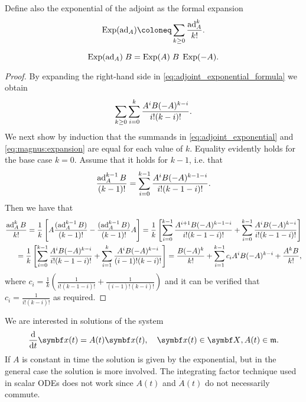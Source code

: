 Define also the exponential of the adjoint as the formal expansion
\begin{equation}
  \label{eq:adjoint_exponential}
  \Exp(\ad_\lx) \coloneq \sum_{k \geq 0} \frac{\ad_\lx^k}{k!}.
\end{equation}

\begin{lemma}
  \label{lemma:expadj}
  \begin{equation}
    \label{eq:adjoint_exponential_formula}
    \operatorname{Exp}(\operatorname{ad}_A) \; B = \operatorname{Exp}(A) \; B \; \operatorname{Exp}(-A).
  \end{equation}
\end{lemma}
\begin{proof}
  By expanding the right-hand side in \eqref{eq:adjoint_exponential_formula} we obtain
  \begin{equation}
    \label{eq:magnus:expansion}
    \sum_{k \geq 0} \sum_{i = 0}^{k} \frac{A^i B (-A)^{k-i}}{i! (k - i)!}.
  \end{equation}
  We next show by induction that the summands in \eqref{eq:adjoint_exponential} and \eqref{eq:magnus:expansion} are equal for each value of $k$. Equality evidently holds for the base case $k=0$. Assume that it holds for $k-1$, i.e. that
  \begin{equation}
    \frac{\operatorname{ad}_A^{k-1} B}{(k-1)!} = \sum_{i=0}^{k-1} \frac{A^i B (-A)^{k-1-i}}{i! (k-1-i)!}.
  \end{equation}
  Then we have that
  \begin{equation*}
    \begin{aligned}
      \frac{\operatorname{ad}_A^{k} B}{k!} = \frac{1}{k} \left[ A \frac{(\operatorname{ad}_A^{k-1} B)}{(k-1)!} - \frac{(\operatorname{ad}_A^{k-1} B)}{(k-1)!} A \right] =
      \frac{1}{k} \left[ \sum_{i=0}^{k-1} \frac{A^{i+1} B (-A)^{k-1-i}}{i! (k-1-i)!} + \sum_{i=0}^{k-1} \frac{A^i B (-A)^{k-i}}{i! (k-1-i)!} \right] \\
      = \frac{1}{k} \left[ \sum_{i=0}^{k-1} \frac{A^i B (-A)^{k-i}}{i! (k-1-i)!} +  \sum_{i=1}^{k} \frac{A^{i} B (-A)^{k-i}}{(i-1)! (k-i)!} \right] = \frac{B (-A)^k}{k!} + \sum_{i=1}^{k-1} c_i A^i B (-A)^{k-i} + \frac{A^k B}{k!},
    \end{aligned}
  \end{equation*}
  where $c_i = \frac{1}{k} \left( \frac{1}{i!(k-1-i)!} + \frac{1}{(i-1)!(k-i)!} \right)$ and it can be verified that $c_i = \frac{1}{i!(k-i)!}$ as required.
\end{proof}

We are interested in solutions of the system
\begin{equation}
  \label{eq:magnus_ode}
  \frac{\mathrm{d}}{\mathrm{d}t} \x(t) = \lx(t) \x(t), \quad \x(t) \in \X, A(t) \in \lX.
\end{equation}
If $A$ is constant in time the solution is given by the exponential, but in the general case the solution is more involved. The integrating factor technique used in scalar ODEs does not work since $A(t)$ and $\dot A(t)$ do not necessarily commute.


